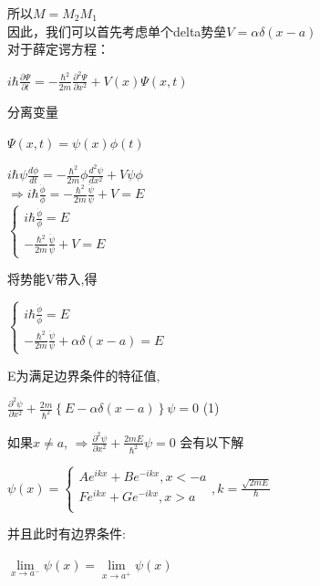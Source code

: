\documentclass[12pt, a4paper, oneside]{ctexart}
\begin{document}
\begin{spacing}{2.0}
所以$M=M_2 M_1$\\
因此，我们可以首先考虑单个delta势垒$V=\alpha\delta(x-a)$
\\对于薛定谔方程：
\begin{center}
  $i\hbar\frac{\partial \Psi}{\partial t} = -\frac{\hbar^2}{2 m} \frac{\partial^2 \Psi}{\partial x^2}+V(x) \Psi(x,t)$
\end{center}
分离变量
\begin{center}
$\Psi(x,t)=\psi(x)\phi(t)$
\end{center}
\begin{center}
$i\hbar\psi\frac{d\phi}{dt}=-\frac{\hbar^2}{2m} \phi\frac{d^2 \psi}{dx^2}+V\psi\phi$\\
$\Rightarrow i\hbar\frac{\dot\phi}{\phi}=-\frac{\hbar^2}{2m}\frac{\ddot\psi}{\psi}+V=E $\\
$\left\{\begin{matrix}    i\hbar\frac{\dot\phi}{\phi}=E \\     -\frac{\hbar^2}{2m}\frac{\ddot\psi}{\psi}+V=E  \end{matrix}\right. $\\
\end{center}
将势能V带入,得
\begin{center}
$\left\{\begin{matrix}    i\hbar\frac{\dot\phi}{\phi}=E \\     -\frac{\hbar^2}{2m}\frac{\ddot\psi}{\psi}+\alpha\delta(x-a)=E  \end{matrix}\right. $\\
\end{center}
E为满足边界条件的特征值,
\begin{center}
$ \frac{\partial^2\psi}{\partial x^2}+\frac{2m}{\hbar^2} \left\{E-\alpha\delta(x-a)\right\}\psi=0$   (1)\\
\end{center}
如果$x\neq a$,
$\Rightarrow \frac{\partial^2\psi}{\partial x^2}+\frac{2mE}{\hbar^2}\psi=0 $
会有以下解
\begin{center}
$\psi(x)= \left\{\begin{matrix}    Ae^{ikx}+Be^{-ikx},x<-a \\  Fe^{ikx}+Ge^{-ikx},x>a\\  \end{matrix}\right. ,k=\frac{\sqrt{2mE}}{\hbar}$\\
\end{center}
并且此时有边界条件:
\begin{center}
$ \lim\limits_{x \to a^-}\psi(x)=\lim\limits_{x\to a^+}\psi(x)$

\end{center}
\end{spacing}
\end{document}

